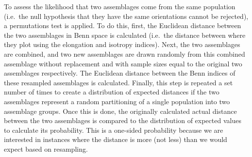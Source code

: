 \documentclass[]{article}
\begin{document}
To assess the likelihood that two assemblages come from the same
population (i.e.~the null hypothesis that they have the same
orientations cannot be rejected), a permutations test is applied. To do
this, first, the Euclidean distance between the two assemblages in Benn
space is calculated (i.e.~the distance between where they plot using the
elongation and isotropy indices). Next, the two assemblages are
combined, and two new assemblages are drawn randomly from this combined
assemblage without replacement and with sample sizes equal to the
original two assemblages respectively. The Euclidean distance between
the Benn indices of these resampled assemblages is calculated. Finally,
this step is repeated a set number of times to create a distribution of
expected distances if the two assemblages represent a random
partitioning of a single population into two assemblage groups. Once
this is done, the originally calculated actual distance between the two
assemblages is compared to the distribution of expected values to
calculate its probability. This is a one-sided probability because we
are interested in instances where the distance is more (not less) than
we would expect based on resampling.
\end{document}

